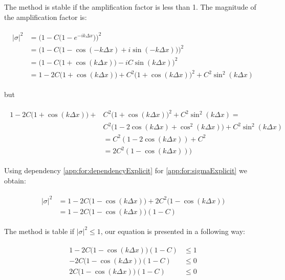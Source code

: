 	The method is stable if the amplification factor is less than 1. The magnitude of the amplification factor is:
	
	\begin{align}
		\begin{split}
			\label{app:for:sigmaExplicit}
			|\sigma|^2 &= \Bigg( 1 - C\Big(1 - e^{-ik\Delta x}\Big)\Bigg)^2 \\
			&= \Bigg( 1 - C\Big(1 -\cos(-k\Delta x) + i\sin(-k\Delta x)\Big)\Bigg)^2 \\
			&= \Bigg(1 - C\Big(1 +\cos(k\Delta x)\Big) - iC\sin(k\Delta x)\Bigg)^2 \\	
			&= 1 - 2C\Big(1 + \cos(k\Delta x)\Big) + C^2\Big(1 +\cos(k\Delta x)\Big)^2 + C^2\sin^2(k\Delta x)
		\end{split}
	\end{align} 
	
	but
	
	\begin{align}
		\begin{split}
			\label{app:for:dependencyExplicit}
			1 - 2C\Big(1 + \cos(k\Delta x)\Big) + &C^2\Big(1 +\cos(k\Delta x)\Big)^2 + C^2\sin^2(k\Delta x) = \\&C^2\Bigg(1 - 2\cos(k\Delta x) + \cos^2(k\Delta x)\Bigg) + C^2\sin^2(k\Delta x) \\
			&= C^2(1-2\cos(k\Delta x)) + C^2 \\
			&= 2C^2(1-\cos(k\Delta x)))
		\end{split}
	\end{align} 
	
	Using dependency \ref{app:for:dependencyExplicit} for \ref{app:for:sigmaExplicit} we obtain:
	
	\begin{align}
		\begin{split}
			|\sigma|^2 &= 1 - 2C\Big(1-\cos(k\Delta x)\Big) + 2C^2\Big(1 - \cos(k\Delta x)\Big) \\
			&= 1-2C\Big(1-\cos(k\Delta x)\Big)(1-C)
		\end{split}
	\end{align} 
	
	The method is table if $|\sigma|^2 \leq 1$, our equation is presented in a following way:
	
	\begin{align}
		\begin{split}
			1-2C\Big(1-\cos(k\Delta x)\Big)(1-C) &\leq 1 \\
			-2C\Big(1-\cos(k\Delta x)\Big)(1-C) &\leq 0 \\
			2C\Big(1-\cos(k\Delta x)\Big)(1-C) &\leq0 \\
		\end{split}
	\end{align} 
	
